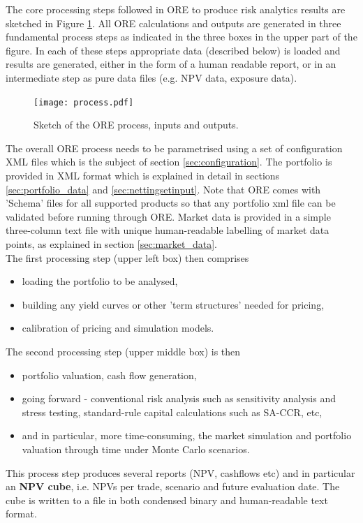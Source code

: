 \documentclass[12pt, a4paper]{article}
\begin{document}
The core processing steps followed in ORE to produce risk analytics results are sketched in Figure \ref{fig_process}.
All ORE calculations and outputs are generated in three fundamental process steps as indicated in the three boxes in the
upper part of the figure. In each of these steps appropriate data (described below) is loaded and results are generated,
either in the form of a human readable report, or in an intermediate step as pure data files (e.g. NPV data, exposure data).
\begin{figure}[h]
\begin{center}
\texttt{[image: process.pdf]}
\end{center}
\caption{Sketch of the ORE process, inputs and outputs. }
\label{fig_process}
\end{figure}

The overall ORE process needs to be parametrised using a set of configuration XML files which is the subject of section
\ref{sec:configuration}. The portfolio is provided in XML format which is explained in detail in sections
\ref{sec:portfolio_data} and \ref{sec:nettingsetinput}. Note that ORE comes with 'Schema' files for all supported
products so that any portfolio xml file can be validated before running through ORE. Market data is provided in a simple
three-column text file with unique human-readable labelling of market data points, as explained in section
\ref{sec:market_data}.  \\

The first processing step (upper left box) then comprises 
\begin{itemize}
\item loading the portfolio to be analysed, 
\item building any yield curves or other 'term structures' needed for pricing, 
\item calibration of pricing and simulation models.
\end{itemize}

The second processing step (upper middle box) is then 
\begin{itemize}
\item portfolio valuation, cash flow generation,
\item going forward - conventional risk analysis such as sensitivity analysis and stress testing, standard-rule capital
  calculations such as SA-CCR, etc,
\item and in particular, more time-consuming, the market simulation and portfolio valuation through time under Monte
  Carlo scenarios.
\end{itemize}
This process step produces several reports (NPV, cashflows etc) and in particular an {\bf NPV cube}, i.e. NPVs per
trade, scenario and future evaluation date. The cube is written to a file in both condensed binary and human-readable
text format.  \\
\end{document}
